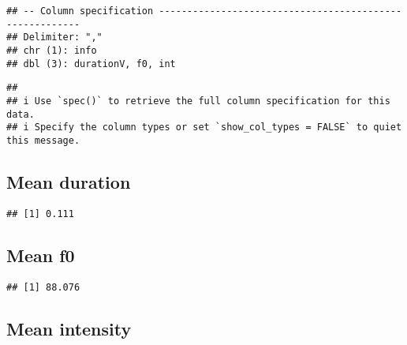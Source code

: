 \documentclass[
]{article}
\newenvironment{Shaded}{\begin{snugshade}}{\end{snugshade}}
\newcommand{\FunctionTok}[1]{\textcolor[rgb]{0.00,0.00,0.00}{#1}}
\newcommand{\NormalTok}[1]{#1}
\newcommand{\SpecialCharTok}[1]{\textcolor[rgb]{0.00,0.00,0.00}{#1}}
\begin{document}
\begin{verbatim}
## -- Column specification --------------------------------------------------------
## Delimiter: ","
## chr (1): info
## dbl (3): durationV, f0, int
\end{verbatim}

\begin{verbatim}
## 
## i Use `spec()` to retrieve the full column specification for this data.
## i Specify the column types or set `show_col_types = FALSE` to quiet this message.
\end{verbatim}

\hypertarget{mean-duration}{%
\subsection{Mean duration}\label{mean-duration}}

\begin{Shaded}
\end{Shaded}

\begin{verbatim}
## [1] 0.111
\end{verbatim}

\hypertarget{mean-f0}{%
\subsection{Mean f0}\label{mean-f0}}

\begin{Shaded}
\end{Shaded}

\begin{verbatim}
## [1] 88.076
\end{verbatim}

\hypertarget{mean-intensity}{%
\subsection{Mean intensity}\label{mean-intensity}}

\begin{Shaded}
\end{Shaded}
\end{document}
